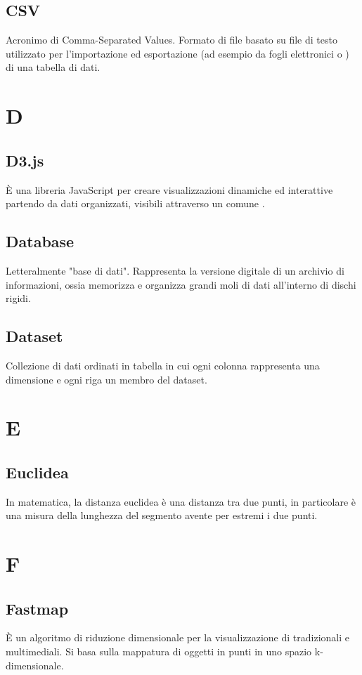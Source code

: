 \subsection*{CSV}
Acronimo di Comma-Separated Values. Formato di file basato su file di testo utilizzato per l'importazione ed esportazione (ad esempio da fogli elettronici o ) di una tabella di dati.

\section*{D}

\subsection*{D3.js}
È una libreria JavaScript per creare visualizzazioni dinamiche ed interattive partendo da dati organizzati, visibili attraverso un comune .


\subsection*{Database}
Letteralmente "base di dati". Rappresenta la versione digitale di un archivio di informazioni, ossia memorizza e organizza grandi moli di dati all'interno di dischi rigidi.

\subsection*{Dataset}
Collezione di dati ordinati in tabella in cui ogni colonna rappresenta una dimensione e ogni riga un membro del dataset.

\section*{E}

\subsection*{Euclidea}
In matematica, la distanza euclidea è una distanza tra due punti, in particolare è una misura della lunghezza del segmento avente per estremi i due punti.

\section*{F}

\subsection*{Fastmap}
È un algoritmo di riduzione dimensionale per la visualizzazione di  tradizionali e multimediali. Si basa sulla mappatura di oggetti in punti in uno spazio k-dimensionale.

